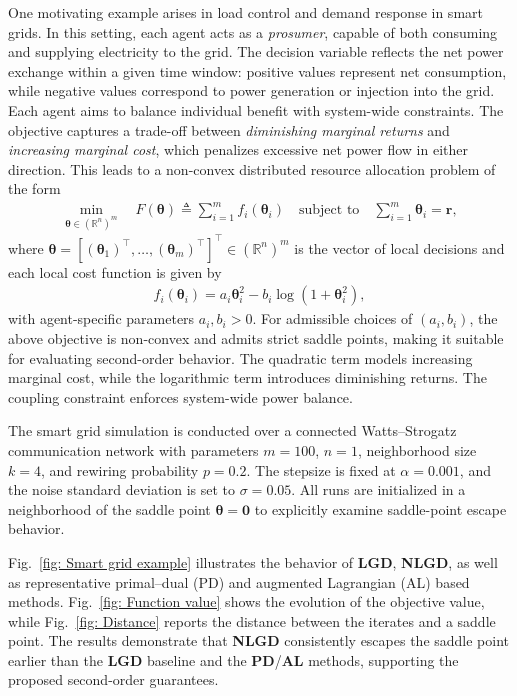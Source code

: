 \documentclass{siamart251216}
\begin{document}
One motivating example arises in load control and demand response in smart grids. In this setting, each agent acts as a \emph{prosumer}, capable of both consuming and supplying electricity to the grid. The decision variable reflects the net power exchange within a given time window: positive values represent net consumption, while negative values correspond to power generation or injection into the grid. Each agent aims to balance individual benefit with system-wide constraints. The objective captures a trade-off between \emph{diminishing marginal returns} and \emph{increasing marginal cost}, which penalizes excessive net power flow in either direction. This leads to a non-convex distributed resource allocation problem of the form
\begin{gather*}
    \min_{\boldsymbol{\theta} \in (\mathbb{R}^{n})^{m}} \quad
    F(\boldsymbol{\theta}) \triangleq \sum_{i=1}^{m} f_{i}(\boldsymbol{\theta}_{i})
    \quad \text{subject to} \quad
    \sum_{i=1}^{m} \boldsymbol{\theta}_{i} = \mathbf{r},
\end{gather*}
where $\boldsymbol{\theta} = [(\boldsymbol{\theta}_{1})^{\top}, \dots, (\boldsymbol{\theta}_{m})^{\top}]^{\top} \in (\mathbb{R}^{n})^{m}$ is the vector of local decisions and each local cost function is given by
\begin{gather*}
    f_{i}(\boldsymbol{\theta}_{i}) = a_{i} \boldsymbol{\theta}_{i}^{2} - b_{i} \log(1 + \boldsymbol{\theta}_{i}^{2}),
\end{gather*}
with agent-specific parameters $a_{i}, b_{i} > 0$. For admissible choices of $(a_i,b_i)$, the above objective is non-convex and admits strict saddle points, making it suitable for evaluating second-order behavior. The quadratic term models increasing marginal cost, while the logarithmic term introduces diminishing returns. The coupling constraint enforces system-wide power balance.

The smart grid simulation is conducted over a connected Watts--Strogatz communication network \cite{watts1998collective} with parameters $m = 100$,
$n = 1$, neighborhood size $k = 4$, and rewiring probability $p = 0.2$. The stepsize is fixed at $\alpha = 0.001$, and the noise standard deviation is set to $\sigma = 0.05$.
All runs are initialized in a neighborhood of the saddle point $\boldsymbol{\theta}=\mathbf{0}$ to explicitly examine saddle-point escape behavior.

Fig.~\ref{fig: Smart grid example} illustrates the behavior of \textbf{LGD}, \textbf{NLGD}, as well as representative primal--dual (PD) \cite{ding2018primal} and augmented Lagrangian (AL) \cite{ananduta2021distributed} based methods. Fig.~\ref{fig: Function value} shows the evolution of the objective value, while Fig.~\ref{fig: Distance} reports the distance between the iterates and a saddle point.
The results demonstrate that \textbf{NLGD} consistently escapes the saddle point earlier than the \textbf{LGD} baseline and the \textbf{PD}/\textbf{AL} methods, supporting the proposed second-order guarantees.
\end{document}
